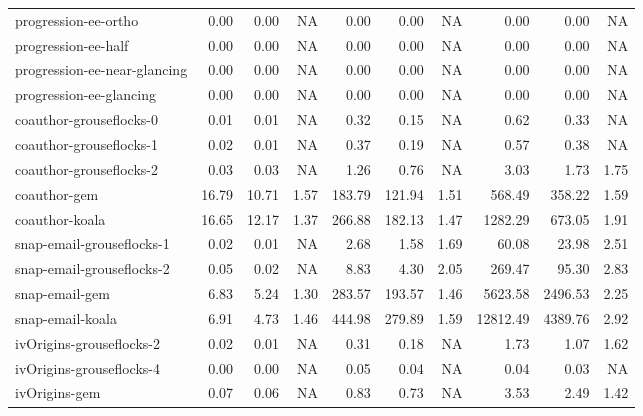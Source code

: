 \begin{tabular}{l|rrr|rrr|rrr}
           progression-ee-ortho &   0.00 &   0.00 &       NA &    0.00 &   0.00 &       NA &     0.00 &    0.00 &    NA \\
            progression-ee-half &   0.00 &   0.00 &       NA &    0.00 &   0.00 &       NA &     0.00 &    0.00 &    NA \\
   progression-ee-near-glancing &   0.00 &   0.00 &       NA &    0.00 &   0.00 &       NA &     0.00 &    0.00 &    NA \\
        progression-ee-glancing &   0.00 &   0.00 &       NA &    0.00 &   0.00 &       NA &     0.00 &    0.00 &    NA \\
        coauthor-grouseflocks-0 &   0.01 &   0.01 &       NA &    0.32 &   0.15 &       NA &     0.62 &    0.33 &    NA \\
        coauthor-grouseflocks-1 &   0.02 &   0.01 &       NA &    0.37 &   0.19 &       NA &     0.57 &    0.38 &    NA \\
        coauthor-grouseflocks-2 &   0.03 &   0.03 &       NA &    1.26 &   0.76 &       NA &     3.03 &    1.73 &  1.75 \\
                   coauthor-gem &  16.79 &  10.71 &     1.57 &  183.79 & 121.94 &     1.51 &   568.49 &  358.22 &  1.59 \\
                 coauthor-koala &  16.65 &  12.17 &     1.37 &  266.88 & 182.13 &     1.47 &  1282.29 &  673.05 &  1.91 \\
      snap-email-grouseflocks-1 &   0.02 &   0.01 &       NA &    2.68 &   1.58 &     1.69 &    60.08 &   23.98 &  2.51 \\
      snap-email-grouseflocks-2 &   0.05 &   0.02 &       NA &    8.83 &   4.30 &     2.05 &   269.47 &   95.30 &  2.83 \\
                 snap-email-gem &   6.83 &   5.24 &     1.30 &  283.57 & 193.57 &     1.46 &  5623.58 & 2496.53 &  2.25 \\
               snap-email-koala &   6.91 &   4.73 &     1.46 &  444.98 & 279.89 &     1.59 & 12812.49 & 4389.76 &  2.92 \\
       ivOrigins-grouseflocks-2 &   0.02 &   0.01 &       NA &    0.31 &   0.18 &       NA &     1.73 &    1.07 &  1.62 \\
       ivOrigins-grouseflocks-4 &   0.00 &   0.00 &       NA &    0.05 &   0.04 &       NA &     0.04 &    0.03 &    NA \\
                  ivOrigins-gem &   0.07 &   0.06 &       NA &    0.83 &   0.73 &       NA &     3.53 &    2.49 &  1.42 \\

\end{tabular}
